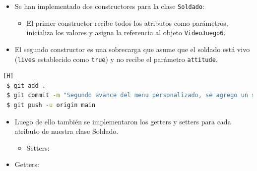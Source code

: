 \documentclass{article}
\begin{document}
\begin{itemize}
    \item Se han implementado dos constructores para la clase \texttt{Soldado}:
    \begin{itemize}
        \item El primer constructor recibe todos los atributos como parámetros, inicializa los valores y asigna la referencia al objeto \texttt{VideoJuego6}.
    \end{itemize}
\end{itemize}



\begin{itemize}
    \begin{itemize}
        \item El segundo constructor es una sobrecarga que asume que el soldado está vivo (\texttt{lives} establecido como \texttt{true}) y no recibe el parámetro \texttt{attitude}.
    \end{itemize}
\end{itemize}


\begin{lstlisting}[language=bash,caption={Commit \href{https://github.com/hernanchoquehuanca/fp2-23b/commit/8afc11f2a3dd1fd16175506dc53913adde817dbe}{8afc11f}: Segundo avance del menu personalizado, se agrego un segundo constructor e implemento crear y eliminar soldados}][H]
 $ git add .
 $ git commit -m "Segundo avance del menu personalizado, se agrego un segundo constructor e implemento crear y eliminar soldados"			
 $ git push -u origin main
\end{lstlisting}

\newpage

\begin{itemize}
    \item Luego de ello también se implementaron los getters y setters para cada atributo de nuestra clase Soldado.
    \begin{itemize}
        \item Setters: 
    \end{itemize}
\end{itemize}



\newpage %

\begin{itemize}
    \begin{itemize}
        \item Getters: 
    \end{itemize}
\end{itemize}

\end{document}
